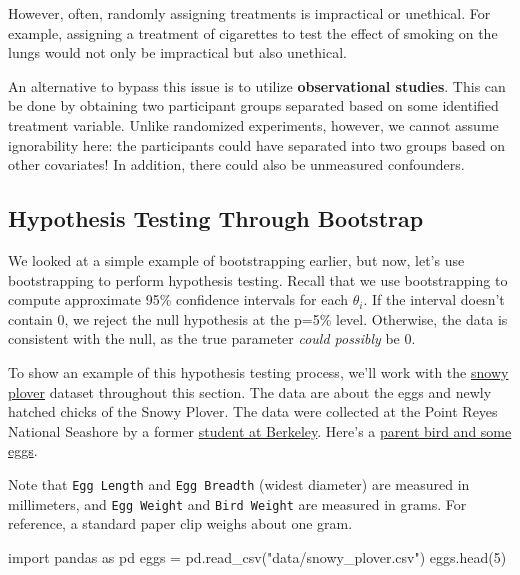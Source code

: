 \documentclass[
  letterpaper,
  DIV=11,
  numbers=noendperiod]{scrreprt}
\newenvironment{Shaded}{\begin{snugshade}}{\end{snugshade}}
\newcommand{\DecValTok}[1]{\textcolor[rgb]{0.68,0.00,0.00}{#1}}
\newcommand{\ImportTok}[1]{\textcolor[rgb]{0.00,0.46,0.62}{#1}}
\newcommand{\NormalTok}[1]{\textcolor[rgb]{0.00,0.23,0.31}{#1}}
\newcommand{\OperatorTok}[1]{\textcolor[rgb]{0.37,0.37,0.37}{#1}}
\newcommand{\StringTok}[1]{\textcolor[rgb]{0.13,0.47,0.30}{#1}}
\begin{document}
However, often, randomly assigning treatments is impractical or
unethical. For example, assigning a treatment of cigarettes to test the
effect of smoking on the lungs would not only be impractical but also
unethical.

An alternative to bypass this issue is to utilize \textbf{observational
studies}. This can be done by obtaining two participant groups separated
based on some identified treatment variable. Unlike randomized
experiments, however, we cannot assume ignorability here: the
participants could have separated into two groups based on other
covariates! In addition, there could also be unmeasured confounders.

\subsection{Hypothesis Testing Through
Bootstrap}\label{hypothesis-testing-through-bootstrap}

We looked at a simple example of bootstrapping earlier, but now, let's
use bootstrapping to perform hypothesis testing. Recall that we use
bootstrapping to compute approximate 95\% confidence intervals for each
\(\theta_i\). If the interval doesn't contain 0, we reject the null
hypothesis at the p=5\% level. Otherwise, the data is consistent with
the null, as the true parameter \emph{could possibly} be 0.

To show an example of this hypothesis testing process, we'll work with
the \href{https://www.audubon.org/field-guide/bird/snowy-plover}{snowy
plover} dataset throughout this section. The data are about the eggs and
newly hatched chicks of the Snowy Plover. The data were collected at the
Point Reyes National Seashore by a former
\href{https://openlibrary.org/books/OL2038693M/BLSS_the_Berkeley_interactive_statistical_system}{student
at Berkeley}. Here's a
\href{http://cescos.fau.edu/jay/eps/articles/snowyplover.html}{parent
bird and some eggs}.

Note that \texttt{Egg\ Length} and \texttt{Egg\ Breadth} (widest
diameter) are measured in millimeters, and \texttt{Egg\ Weight} and
\texttt{Bird\ Weight} are measured in grams. For reference, a standard
paper clip weighs about one gram.

\begin{Shaded}
\begin{Highlighting}[]
\ImportTok{import}\NormalTok{ pandas }\ImportTok{as}\NormalTok{ pd}
\NormalTok{eggs }\OperatorTok{=}\NormalTok{ pd.read\_csv(}\StringTok{"data/snowy\_plover.csv"}\NormalTok{)}
\NormalTok{eggs.head(}\DecValTok{5}\NormalTok{)}
\end{Highlighting}
\end{Shaded}
\end{document}
